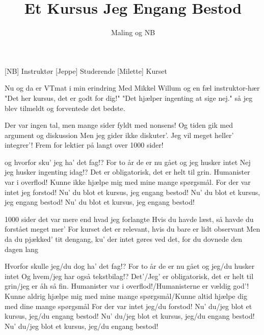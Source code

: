 \documentclass[a4paper,11pt]{article}
\title{Et Kursus Jeg Engang Bestod}
\author{Maling og NB}
\begin{document}
\maketitle

\begin{roles}
[NB] Instruktør
[Jeppe] Studerende
[Milette] Kurset
\end{roles}

\begin{song}
 Nu og da er VTmat i min erindring
Med Mikkel Willum og en fæl instruktor-hær 
"Det her kursus, det er godt for dig!" 
"Det hjælper ingenting at sige nej." 
så jeg blev tilmeldt og forventede det bedste.

 Der var ingen tal, men mange sider fyldt med nonsens! 
Og tiden gik med argument og diskussion 
Men jeg gider ikke diskuter’.
Jeg vil meget heller' integrer'!
Frem for lektier på langt over 1000 sider!

 og hvorfor sku' jeg ha' det fag!? 
For to år de er nu gået og jeg husker intet 
Nej jeg husker ingenting idag!?
Det er obligatorisk, det er helt til grin. 
Humanister var i overflod! 
Kunne ikke hjælpe mig med mine mange spørgsmål. 
For der var intet jeg forstod! 
Nu' du blot et kursus, jeg engang bestod! 
Nu' du blot et kursus, jeg engang bestod! 
Nu' du blot et kursus, jeg engang bestod!

 1000 sider det var mere end hvad jeg forlangte 
Hvis du havde læst, så havde du forstået meget mer' 
For kurset det er relevant,
hvis du bare er lidt observant 
Men da du pjækked' tit dengang, 
ku' der intet gøres ved det, for du dovnede den dagen lang

 Hvorfor skulle jeg/du dog ha' det fag!? 
For to år de er nu gået og jeg/du husker intet 
Og hvem/jeg har også tekstbilag!? 
Det’/Jeg’ er obligatorisk,
det er helt til grin/jeg er åh så fin. 
Humanister var i overflod!/Humanisterne er vældig god’!
Kunne aldrig hjælpe mig med mine mange spørgsmål/Kunne altid hjælpe dig med dine mange spørgsmål
For der var intet jeg/du forstod! 
Nu' du/jeg blot et kursus, jeg/du engang bestod! 
Nu' du/jeg blot et kursus, jeg/du engang bestod! 
Nu' du/jeg blot et kursus, jeg/du engang bestod! 

\end{song}
\end{document}
